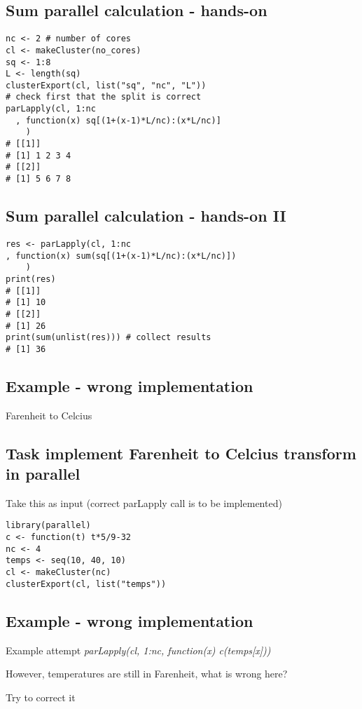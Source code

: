 \documentclass[bigger]{beamer}
\begin{document}
\subsection{Sum parallel calculation - hands-on}
\label{sec-3-5}
\begin{verbatim}
nc <- 2 # number of cores
cl <- makeCluster(no_cores)
sq <- 1:8
L <- length(sq)
clusterExport(cl, list("sq", "nc", "L"))
# check first that the split is correct
parLapply(cl, 1:nc
  , function(x) sq[(1+(x-1)*L/nc):(x*L/nc)]
	)
# [[1]] 
# [1] 1 2 3 4
# [[2]]
# [1] 5 6 7 8
\end{verbatim}

\subsection{Sum parallel calculation - hands-on II}
\label{sec-3-6}
\begin{verbatim}
res <- parLapply(cl, 1:nc
, function(x) sum(sq[(1+(x-1)*L/nc):(x*L/nc)])
	)
print(res)
# [[1]]
# [1] 10
# [[2]]
# [1] 26
print(sum(unlist(res))) # collect results
# [1] 36
\end{verbatim}

\subsection{Example - wrong implementation}
\label{sec-3-7}
\begin{frame}[label=sec-3-7-1]{Farenheit to Celcius}
\end{frame}
\subsection{Task implement Farenheit to Celcius transform in parallel}
\label{sec-3-8}
\begin{frame}[fragile,label=sec-3-8-1]{Take this as input (correct \alert{parLapply} call is to be implemented)}
 \begin{verbatim}
library(parallel)
c <- function(t) t*5/9-32
nc <- 4
temps <- seq(10, 40, 10)
cl <- makeCluster(nc)
clusterExport(cl, list("temps"))
\end{verbatim}
\end{frame}
\subsection{Example - wrong implementation}
\label{sec-3-9}
\begin{frame}[label=sec-3-9-1]{Example attempt}
\emph{parLapply(cl, 1:nc, function(x) c(temps[x]))}
\end{frame}
\begin{frame}[label=sec-3-9-2]{However, temperatures are still in Farenheit, what is wrong here?}
\end{frame}
\begin{frame}[label=sec-3-9-3]{Try to correct it}
\end{frame}
\end{document}
